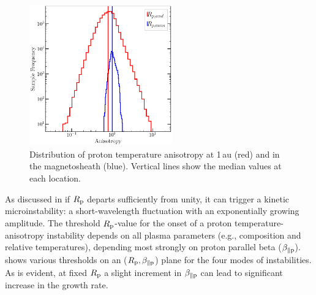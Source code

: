         \begin{figure}
            \begin{center}
                \includegraphics[width=0.55\textwidth]{figures/chap2/proton_aniso_dis_mms_wnd.pdf}
                \caption[$R_{\rm p}$ distribution at 1\,au and in magnetosheath]{Distribution of proton temperature anisotropy at 1\,au (red) and in the magnetosheath (blue). Vertical lines show the median values at each location.}
                \label{fig:aniso_wnd_mms}
            \end{center}
        \end{figure}

        As discussed in  if $R_{\rm p}$ departs sufficiently from unity, it can
        trigger a kinetic microinstability: a short-wavelength fluctuation with an exponentially
        growing amplitude. The threshold $R_{\rm p}$-value for the onset of a proton
        temperature-anisotropy instability depends on all plasma parameters (e.g., composition and
        relative temperatures), depending most strongly on proton parallel beta ($\beta_{\parallel
        \rm p}$).  shows various thresholds on an ($R_{\rm p}, \beta_{\rm
        \parallel p}$) plane for the four modes of instabilities. As is evident, at fixed $R_{\rm
        p}$ a slight increment in $\beta_{\parallel \rm p}$ can lead to significant increase in the
        growth rate.


